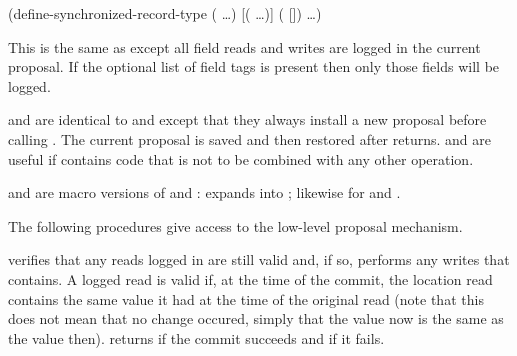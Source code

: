 \begin{example}
(define-synchronized-record-type  
  (  \ldots)
  [(\cvar {} \ldots)]
  (  [])
  \ldots)
\end{example}
This is the same as 
 except all field reads and
 writes are logged in the current proposal.
If the optional list of field tags is present then only those fields will
 be logged.

\begin{protos}
\end{protos}
\noindent
{} and  are identical
 to  and  except that they
 always install a new proposal before calling .
The current proposal is saved and then restored after  returns.
 and  are useful if  contains
 code that is not to be combined with any other operation.

 and  are macro versions of
 and :
 expands into
; likewise for
 and .


The following procedures give access to the low-level proposal mechanism.
\begin{protos}
\end{protos}
\noindent
{} verifies that any reads logged in  are
 still valid and, if so, performs any writes that  contains.
A logged read is valid if, at the time of the commit, the location read contains
 the same value it had at the time of the original read (note that this does
 not mean that no change occured, simply that the value now is the same as
 the value then).
 returns  if the commit succeeds and 
 if it fails.

